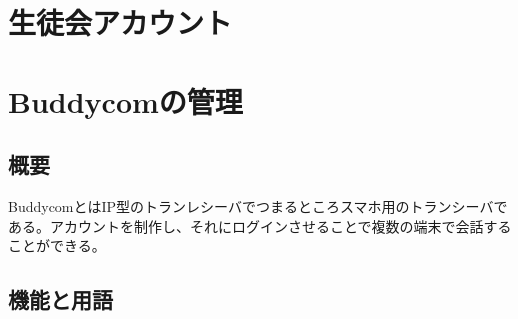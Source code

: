 \documentclass[dvipdfmx,jb5]{jarticle}
\begin{document}
\section{生徒会アカウント}

\section{Buddycomの管理}
\subsection{概要}
BuddycomとはIP型のトランレシーバでつまるところスマホ用のトランシーバである。アカウントを制作し、それにログインさせることで複数の端末で会話することができる。
\subsection{機能と用語}
\end{document}
